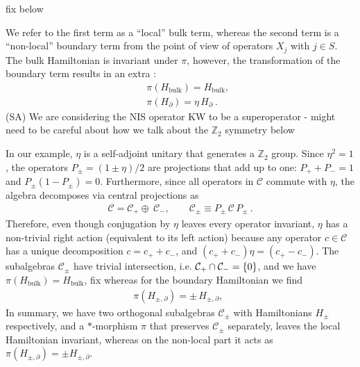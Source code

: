 \documentclass{article}
\newcommand{\mC}{\mathcal{C}}
\theoremstyle{definition}
\newcommand{\SA}[1]{{\color{sulaiman}\footnotesize{(SA) #1}}}
\begin{document}
  \color{brown}
  fix below
  \color{black}

  We refer to the first term as a ``local'' bulk term, whereas the second term is
  a ``non-local'' boundary term from the point of view of operators $X_{j}$ with
  $j\in S$. The bulk Hamiltonian is invariant under $\pi$, however, the
  transformation of the boundary term results in an extra :
  \begin{eqnarray}
    &&\pi(H_{\text{bulk}})=H_{\text{bulk}},\\
    &&\pi(H_{\partial})=\eta\, H_{\partial}\ .
  \end{eqnarray}
  \SA{We are considering the NIS operator KW to be a superoperator - might need to be careful about how we talk about the $\mathbb{Z}_{2}$ symmetry below}

  In our example, $\eta$ is a self-adjoint unitary that generates a $\mathbb{Z}_{2}$
  group. Since $\eta^{2}=1$, the operators $P_{\pm}=(1\pm\eta)/2$ are projections
  that add up to one: $P_{+}+P_{-}=1$ and $P_{\pm}(1-P_{\pm})=0$. Furthermore,
  since all operators in $\mC$ commute with $\eta$, the algebra decomposes via central
  projections as
  \begin{eqnarray}
    \mC=\mC_+ \oplus\ \mC_-,\qquad \mC_\pm\equiv P_\pm\,\mC\,P_\pm\ .
  \end{eqnarray}
  Therefore, even though conjugation by $\eta$ leaves every operator invariant, $\eta$
  has a non-trivial right action (equivalent to its left action) because any operator
  $c\in \mC$ has a unique decomposition $c=c_{+}+c_{-}$, and
  $(c_{+}+c_{-})\eta=(c_{+}-c_{-})$. The subalgebras $\mC_{\pm}$ have trivial intersection,
  i.e. $\mC_{+}\cap\mC_{-}=\{0\}
  \color{black}$, and we have $\pi(H_{\text{bulk}})=H_{\text{bulk}}$,
  \color{brown}
  fix
  \color{black}
  whereas for the boundary Hamiltonian we find
  \begin{eqnarray}
    &&\pi(H_{\pm,\partial})=\pm\, H_{\pm,\partial},\qquad
  \end{eqnarray}
  In summary, we have two orthogonal subalgebras $\mC_{\pm}$ with Hamiltonians
  $H_{\pm}$ respectively, and a $*$-morphism $\pi$ that preserves $\mC_{\pm}$ separately,
  leaves the local Hamiltonian invariant, whereas on the non-local part it acts as
  $\pi(H_{\pm,\partial})=\pm H_{\pm,\partial}$.
\end{document}
